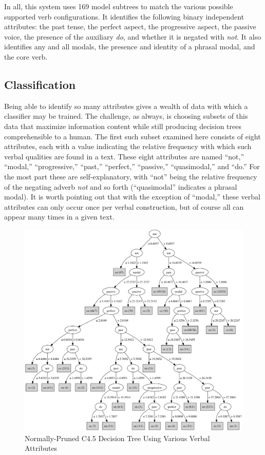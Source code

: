 \documentclass[main.tex]{subfiles}
\begin{document}
In all, this system uses 169 model subtrees to match the various possible supported verb configurations. It identifies the following binary independent attributes: the past tense, the perfect aspect, the progressive aspect, the passive voice, the presence of the auxiliary \textit{do}, and whether it is negated with \textit{not}. It also identifies any and all modals, the presence and identity of a phrasal modal, and the core verb.

\subsection{Classification}
Being able to identify so many attributes gives a wealth of data with which a classifier may be trained. The challenge, as always, is choosing subsets of this data that maximize information content while still producing decision trees comprehensible to a human. The first such subset examined here consists of eight attributes, each with a value indicating the relative frequency with which such verbal qualities are found in a text. These eight attributes are named ``not,'' ``modal,'' ``progressive,'' ``past,'' ``perfect,'' ``passive,'' ``quasimodal,'' and ``do.'' For the most part these are self-explanatory, with ``not'' being the relative frequency of the negating adverb \textit{not} and so forth (``quasimodal'' indicates a phrasal modal). It is worth pointing out that with the exception of ``modal,'' these verbal attributes can only occur once per verbal construction, but of course all can appear many times in a given text. 

\begin{figure}[htbp]
\centering
\includegraphics[width=6in]{unpruned-basic-verb-tree.pdf}
\caption{Normally-Pruned C4.5 Decision Tree Using Various Verbal Attributes}
\label{fig:normally-pruned-basic-verb-tree}
\end{figure}
\end{document}
